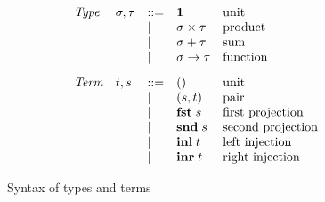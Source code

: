 \begin{figure}
  \small
  \[
  \begin{array}{lllll}
    \textit{Type} &
    \sigma, \tau
    & ::= &
    \mathbf{1}
    &
    \text{unit}
    \\
    && | &
    \sigma \times \tau
    &
    \text{product}
    \\
    && | &
    \sigma + \tau
    &
    \text{sum}
    \\
    && | &
    \sigma \to \tau
    &
    \text{function}
    \\[3mm]
    \textit{Term} &
    t, s
    & ::= &
    ()
    &
    \text{unit}
    \\
    && | &
    (s,t)
    &
    \text{pair}
    \\
    && | &
    \mathbf{fst}\;s
    &
    \text{first projection}
    \\
    && | &
    \mathbf{snd}\;s
    &
    \text{second projection}
    \\
    && | &
    \mathbf{inl}\;t
    &
    \text{left injection}
    \\
    && | &
    \mathbf{inr}\;t
    &
    \text{right injection}
  \end{array}
  \]
  \caption{Syntax of types and terms}
\end{figure}
